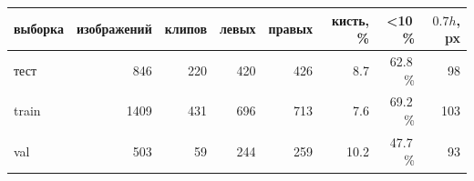 \begin{tabular}{lrrrrrrr}
\toprule
выборка & изображений & клипов & левых & правых & кисть, \% & <10\,\% & $0.7h$, px \\
\midrule
тест & 846 & 220 & 420 & 426 & 8.7 & 62.8\,\% & 98 \\
train & 1409 & 431 & 696 & 713 & 7.6 & 69.2\,\% & 103 \\
val & 503 & 59 & 244 & 259 & 10.2 & 47.7\,\% & 93 \\
\bottomrule
\end{tabular}
